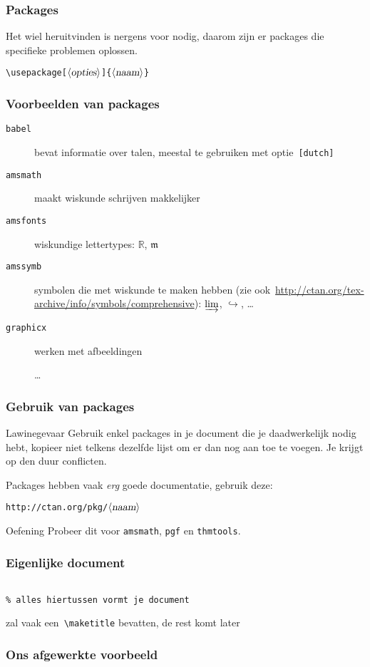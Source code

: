 \begin{frame}[fragile]
  \frametitle{Packages}
  Het wiel heruitvinden is nergens voor nodig, daarom zijn er packages die specifieke problemen oplossen.

  \textcolor{uagreen}{\texttt{\textbackslash usepackage}}\verb|[|$\langle\textsl{opties}\rangle$\verb|]{|$\langle\textsl{naam}\rangle$\verb|}|
\end{frame}

\begin{frame}[fragile]
  \frametitle{Voorbeelden van packages}

  \begin{description}
	\item[\texttt{babel}] bevat informatie over talen, meestal te gebruiken met optie~\texttt{[dutch]}
	\item[\texttt{amsmath}] maakt wiskunde schrijven makkelijker
	\item[\texttt{amsfonts}] wiskundige lettertypes: $\mathbb{R}$, $\mathfrak{m}$
	\item[\texttt{amssymb}] symbolen die met wiskunde te maken hebben (zie ook~\url{http://ctan.org/tex-archive/info/symbols/comprehensive}): $\varinjlim$, $\hookrightarrow$, \ldots
    \item[\texttt{graphicx}] werken met afbeeldingen
    \item[] \ldots
  \end{description}
\end{frame}

\begin{frame}[fragile]
  \frametitle{Gebruik van packages}

  \begin{alertblock}{Lawinegevaar}
    Gebruik enkel packages in je document die je daadwerkelijk nodig hebt, kopieer niet telkens dezelfde lijst om er dan nog aan toe te voegen. Je krijgt op den duur conflicten.
  \end{alertblock}

  Packages hebben vaak \emph{erg} goede documentatie, gebruik deze:

  \texttt{http://ctan.org/pkg/$\langle\textsl{naam}\rangle$}
  \pause
  \begin{exampleblock}{Oefening}
    Probeer dit voor \verb|amsmath|, \verb|pgf| en \verb|thmtools|.
  \end{exampleblock}
\end{frame}

\begin{frame}[fragile]
  \frametitle{Eigenlijke document}

  \begin{verbatim}

% alles hiertussen vormt je document

  \end{verbatim}

  zal vaak een~\texttt{\textcolor{uagreen}{\textbackslash maketitle}} bevatten, de rest komt later
\end{frame}

\begin{frame}[fragile]
  \frametitle{Ons afgewerkte voorbeeld}
  \inputminted{latex}{test-4.tex}
\end{frame}
